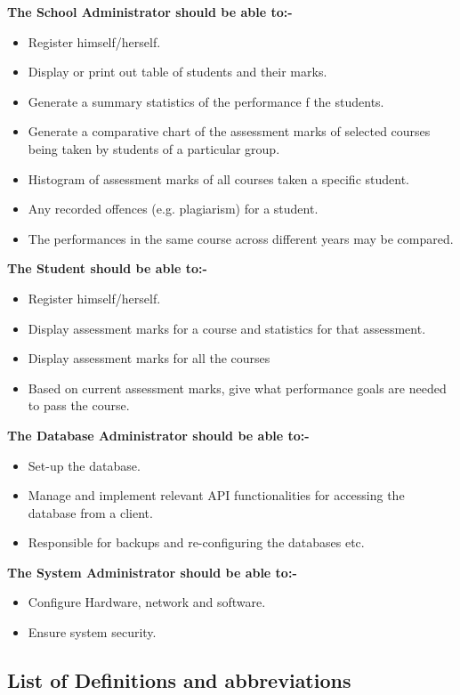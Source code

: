 \documentclass[10pt,onecolumn]{lab}
\begin{document}
\textbf{The School Administrator should be able to:-}
\begin{itemize}
\item Register himself/herself.
\item Display or print out table of students and their marks.
\item Generate a summary statistics of the performance f the students. 
\item Generate a comparative chart of the assessment marks of selected courses being taken by students of a particular group. 
\item Histogram of assessment marks of all courses taken a specific student.   
\item Any recorded offences (e.g. plagiarism) for a student.
\item The performances in the same course across different years may be compared.
\end{itemize}

\textbf{The Student should be able to:-}
\begin{itemize}
\item Register himself/herself.
\item Display assessment marks for a course and statistics for that assessment.
\item Display assessment marks for all the courses  
\item Based on current assessment marks, give what performance goals are needed to pass the course.
\end{itemize}

\textbf{The Database Administrator should be able to:-}
\begin{itemize}
\item Set-up the database.
\item Manage and implement relevant API functionalities for accessing the database from a client.
\item Responsible for backups and re-configuring the databases etc.  
\end{itemize}


\textbf{The System Administrator should be able to:-}
\begin{itemize}
\item Configure Hardware, network and software. 
\item Ensure system security.  
\end{itemize}

\subsection{List of Definitions and abbreviations}
\end{document}
